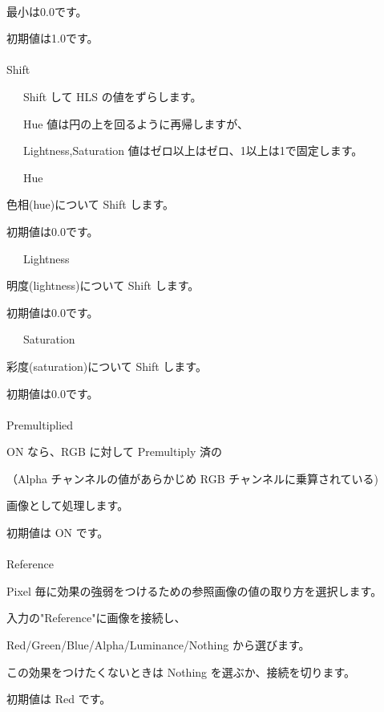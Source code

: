 \documentclass[a4paper,12pt]{article}
\begin{document}
\newpage

\thispagestyle{empty}

\ \vspace{-0.2em}
\par
最小は0.0です。\par
初期値は1.0です。\\
\\
Shift\par
\noindent \ \ \, Shift して HLS の値をずらします。\par
\noindent \ \ \, Hue 値は円の上を回るように再帰しますが、\par
\noindent \ \ \, Lightness,Saturation 値はゼロ以上はゼロ、1以上は1で固定します。\\
\par
\noindent \ \ \, Hue\par
色相(hue)について Shift します。\par
初期値は0.0です。\par
\noindent \ \ \, Lightness\par
明度(lightness)について Shift します。\par
初期値は0.0です。\par
\noindent \ \ \, Saturation\par
彩度(saturation)について Shift します。\par
初期値は0.0です。\\
\\
Premultiplied\par
ON なら、RGB に対して Premultiply 済の\par
（Alpha チャンネルの値があらかじめ RGB チャンネルに乗算されている)\par
画像として処理します。\par
初期値は ON です。\\
\\
Reference\par
Pixel 毎に効果の強弱をつけるための参照画像の値の取り方を選択します。\par
入力の"Reference"に画像を接続し、\par
Red/Green/Blue/Alpha/Luminance/Nothing から選びます。\par
この効果をつけたくないときは Nothing を選ぶか、接続を切ります。\par
初期値は Red です。
\end{document}
